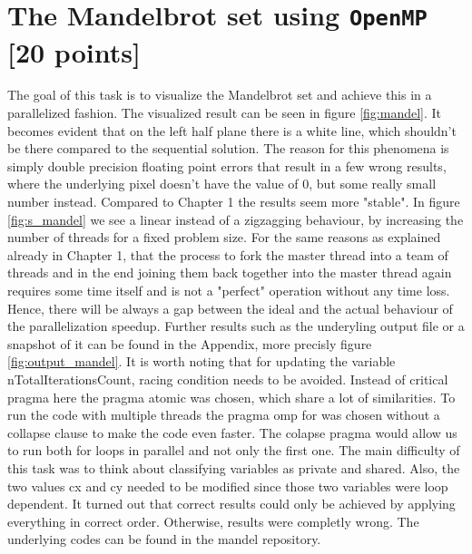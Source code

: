 \documentclass[unicode,11pt,a4paper,oneside,numbers=endperiod,openany]{scrartcl}
\begin{document}
\section{The Mandelbrot set  using \texttt{OpenMP} [20 points]}
\indent
The goal of this task is to visualize the Mandelbrot set and achieve this in a parallelized fashion. The visualized result can be seen 
in figure \ref{fig:mandel}. It becomes evident that on the left half plane there is a white line, which shouldn't be there compared to 
the sequential solution. The reason for this phenomena is simply double precision floating point errors that result in a few wrong results, 
where the underlying pixel doesn't have the value of 0, but some really small number instead.
\newline \indent
Compared to Chapter 1 the results seem more "stable". In figure \ref{fig:s_mandel} we see a linear instead of a zigzagging 
behaviour, by increasing the number of threads for a fixed problem size. For the same reasons as explained already in Chapter 1, that 
the process to fork the master thread into a team of threads and in the end joining them back together into the master thread again 
requires some time itself and is not a "perfect" operation without any time loss. Hence, there will be always a gap between the ideal 
and the actual behaviour of the parallelization speedup. Further results such as the underyling output file or a snapshot of it can be found 
in the Appendix, more precisly figure \ref{fig:output_mandel}.
\newline \indent
It is worth noting that for updating the variable nTotalIterationsCount, racing condition needs to be avoided. Instead of critical pragma 
here the pragma atomic was chosen, which share a lot of similarities. To run the code with multiple threads the pragma omp for was chosen 
without a collapse clause to make the code even faster. The colapse pragma would allow us to run both for loops in parallel and not only 
the first one. The main difficulty of this task was to think about classifying variables as private and shared. Also, the two values 
cx and cy needed to be modified since those two variables were loop dependent. It turned out that correct results could only be achieved 
by applying everything in correct order. Otherwise, results were completly wrong. The underlying codes can be found in the mandel repository.
\end{document}
